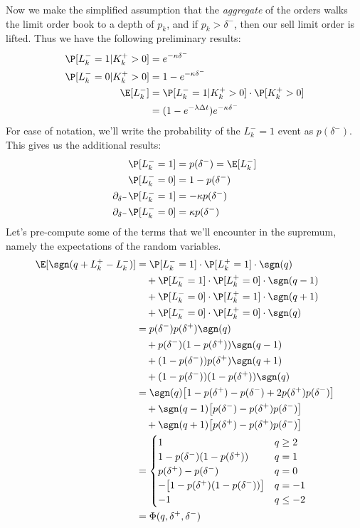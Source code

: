 \documentclass[12pt]{article}
\begin{document}
Now we make the simplified assumption that the \textit{aggregate} of the orders walks the limit order book to a depth of $p_k$, and if $p_k > \delta^-$, then our sell limit order is lifted. Thus we have the following preliminary results:
\begin{align*}
\P [ L_k^- = 1 | K_k^+ > 0] & = e^{-\kappa \delta^-} \\
\P [ L_k^- = 0 | K_k^+ > 0] & = 1 - e^{-\kappa \delta^-} \\
\E [ L_k^- ] & = \P [ L_k^- = 1 | K_k^+ > 0] \cdot \P[K_k^+ > 0] \\
& = ( 1 - e^{-\lambda \Delta t} ) e^{-\kappa \delta^-} \\
\end{align*}
For ease of notation, we'll write the probability of the $L_k^- = 1$ event as $p(\delta^-)$. This gives us the additional results:
\begin{align*}
\P [ L_k^- = 1] & = p(\delta^-) = \E [ L_k^-] \\
\P [ L_k^- = 0] & = 1 - p(\delta^-) \\
\partial_{\delta^-} \P [ L_k^- = 1]  & = -\kappa p(\delta^-) \\
\partial_{\delta^-} \P [ L_k^- = 0] & = \kappa p(\delta^-) \\
\end{align*}
Let's pre-compute some of the terms that we'll encounter in the supremum, namely the expectations of the random variables. 
\begin{align}
\E [\sgn(q + L_k^+ - L_k^-)] & = \P[L_k^- = 1] \cdot \P[L_k^+ = 1] \cdot \sgn(q) \nonumber \\
& \quad + \P[L_k^- = 1] \cdot \P[L_k^+ = 0] \cdot \sgn(q - 1) \nonumber \\
& \quad +  \P[L_k^- = 0] \cdot \P[L_k^+ = 1] \cdot \sgn(q+1) \nonumber \\
& \quad + \P[L_k^- = 0] \cdot \P[L_k^+ = 0] \cdot \sgn(q) \nonumber \\
& = p(\delta^-)p(\delta^+) \sgn(q) \nonumber \\
& \quad + p(\delta^-) (1-p(\delta^+)) \sgn(q - 1) \nonumber \\
& \quad + (1 - p(\delta^-)) p(\delta^+)  \sgn(q+1) \nonumber \\
& \quad + (1 - p(\delta^-)) (1-p(\delta^+))  \sgn(q) \nonumber \\
& = \sgn(q) \bigl[ 1 - p(\delta^+) - p(\delta^-) + 2 p(\delta^+) p(\delta^-) \bigr] \nonumber \\
& \quad + \sgn(q-1) \bigl[ p(\delta^-)  - p(\delta^+) p(\delta^-) \bigr]  \nonumber \\
& \quad + \sgn(q+1) \bigl[ p(\delta^+)  - p(\delta^+) p(\delta^-) \bigr]  \nonumber \\
& = \begin{cases} 
1 & q \geq 2 \\
1 - p(\delta^-)(1 - p(\delta^+)) & q = 1 \\
p(\delta^+) - p(\delta^-) & q = 0 \\
-\bigl[ 1 - p(\delta^+)(1 - p(\delta^-)) \bigr] & q = -1 \\
-1 & q \leq -2
\end{cases} \\
& = \Phi(q, \delta^+, \delta^-)
\end{align}
\end{document}
